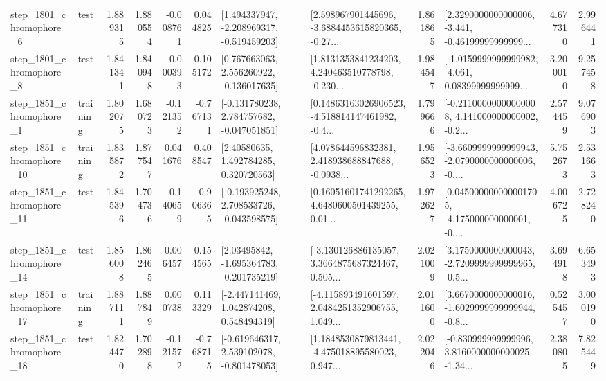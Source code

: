 \begin{tabular}{llrrrrllrlrr}
  step\_1801\_chromophore\_6 &      test &      1.889315 &    1.880554 &     -0.008761 &  0.044825 &   [1.494337947, -2.208969317, -0.519459203] &  [2.598967901445696, -3.6884453615820365, -0.27... &       1.861865 &  [2.3290000000000006, -3.441, -0.46199999999999... &            4.677310 &          2.996441 \\
  step\_1801\_chromophore\_8 &      test &      1.841341 &    1.840948 &     -0.000393 &  0.105172 &    [0.767663063, 2.556260922, -0.136017635] &  [1.8131353841234203, 4.240463510778798, -0.230... &       1.984547 &  [-1.0159999999999982, -4.061, 0.08399999999999... &            3.200010 &          9.257458 \\
  step\_1851\_chromophore\_1 &  training &      1.802075 &    1.680723 &     -0.121352 & -0.767131 &   [-0.131780238, 2.784757682, -0.047051851] &  [0.14863163026906523, -4.518814147461982, -0.4... &       1.799666 &  [-0.21100000000000008, 4.141000000000002, -0.2... &            2.574459 &          9.076903 \\
 step\_1851\_chromophore\_10 &  training &      1.835872 &    1.877547 &      0.041676 &  0.408547 &      [2.40580635, 1.492784285, 0.320720563] &  [4.078644596832381, 2.418938688847688, -0.0938... &       1.956523 &  [-3.6609999999999943, -2.0790000000000006, -0.... &            5.752673 &          2.531663 \\
 step\_1851\_chromophore\_11 &      test &      1.845396 &    1.704736 &     -0.140659 & -0.906365 &   [-0.193925248, 2.708533726, -0.043598575] &  [0.16051601741292265, 4.6480600501439255, 0.01... &       1.972627 &  [0.045000000000001705, -4.175000000000001, -0.... &            4.006725 &          2.728240 \\
 step\_1851\_chromophore\_14 &      test &      1.856008 &    1.862465 &      0.006457 &  0.154565 &    [2.03495842, -1.695364783, -0.201735219] &  [-3.130126886135057, 3.3664875687324467, 0.505... &       2.021009 &  [3.1750000000000043, -2.7209999999999965, -0.5... &            3.694918 &          6.653493 \\
 step\_1851\_chromophore\_17 &  training &      1.887111 &    1.887849 &      0.000738 &  0.113329 &    [-2.447141469, 1.042874208, 0.548494319] &  [-4.115893491601597, 2.0484251352906755, 1.049... &       2.011600 &  [3.6670000000000016, -1.6029999999999944, -0.8... &            0.525457 &          3.000190 \\
 step\_1851\_chromophore\_18 &      test &      1.824470 &    1.702898 &     -0.121572 & -0.768715 &   [-0.619646317, 2.539102078, -0.801478053] &  [1.1848530879813441, -4.475018895580023, 0.947... &       2.022046 &  [-0.830999999999996, 3.8160000000000025, -1.34... &            2.380805 &          7.825449 \\

\end{tabular}
